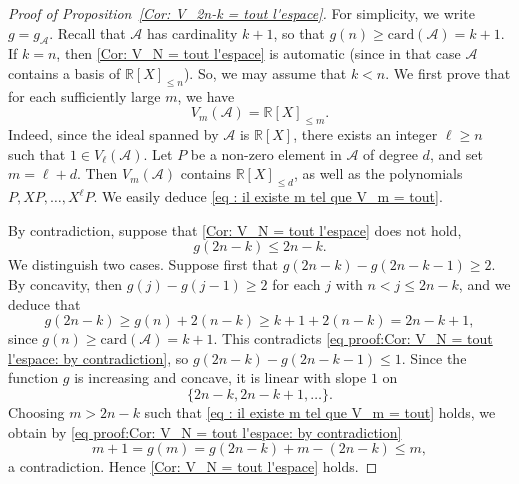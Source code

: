 \documentclass[JEP,XML,SOM,Unicode,NoFloatCountersInSection,published]{cedram}
\newcommand\bR{\mathbb{R}}
\newcommand\cA{\mathcal{A}}
\theoremstyle{definition}
\theoremstyle{plain}
\begin{document}
\begin{proof}[Proof of Proposition~\ref{Cor: V_2n-k = tout l'espace}]
For simplicity, we write $g=g_\cA$. Recall that $\cA$ has cardinality $k+1$, so that $g(n)\geq \textrm{card}(\cA) = k+1$. If $k=n$, then \eqref{Cor: V_N = tout l'espace} is automatic (since in that case $\cA$ contains a basis of $\bR[X]_{\leq n}$). So, we may assume that $k< n$. We first prove that for each sufficiently large $m$, we have
\begin{equation}
\label{eq : il existe m tel que V_m = tout}
V_{m}(\cA) = \bR[X]_{\leq m}.
\end{equation}
Indeed, since the ideal spanned by $\cA$ is $\bR[X]$, there exists an integer $\ell\geq n$ such that $1\in V_\ell(\cA)$. Let $P$ be a non-zero element in $\cA$ of degree $d$, and set $m=\ell+d$. Then $V_{m}(\cA)$ contains $\bR[X]_{\leq d}$, as well as the polynomials $P,XP,\ldots,X^\ell P$. We easily deduce \eqref{eq : il existe m tel que V_m = tout}.

By contradiction, suppose that \eqref{Cor: V_N = tout l'espace} does not hold, \ie
\begin{equation}
\label{eq proof:Cor: V_N = tout l'espace: by contradiction}
g(2n-k) \leq 2n-k.
\end{equation}
We distinguish two cases. Suppose first that $g(2n-k)-g(2n-k-1) \geq 2$. By concavity, then $g(j)-g(j-1)\geq 2$ for each $j$ with $n < j \leq 2n-k$, and we deduce that
\begin{equation*}
g(2n-k) \geq g(n)+2(n-k) \geq k+1 + 2(n-k) = 2n-k+1,
\end{equation*}
since $g(n) \geq \textrm{card}(\cA) = k+1$. This contradicts \eqref{eq proof:Cor: V_N = tout l'espace: by contradiction}, so $g(2n-k)-g(2n-k-1) \leq 1$. Since the function $g$ is increasing and concave, it is linear with slope $1$ on
\[
\{2n-k,2n-k+1,\dots\}.
\]
Choosing $m > 2n-k$ such that \eqref{eq : il existe m tel que V_m = tout} holds, we obtain by \eqref{eq proof:Cor: V_N = tout l'espace: by contradiction}
\begin{equation*}
m+1 = g(m) = g(2n-k)+ m - (2n-k) \leq m,
\end{equation*}
a contradiction. Hence \eqref{Cor: V_N = tout l'espace} holds.
\end{proof}
\end{document}
